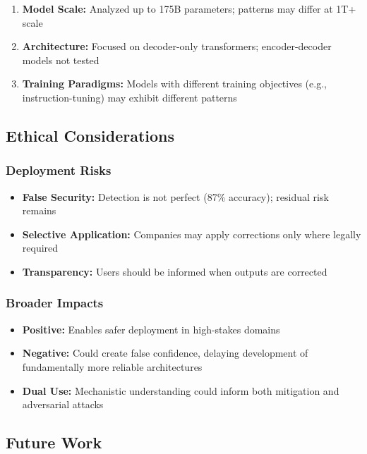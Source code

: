 \documentclass[11pt]{article}
\begin{document}
\begin{enumerate}
    \item \textbf{Model Scale:} Analyzed up to 175B parameters; patterns may differ at 1T+ scale
    \item \textbf{Architecture:} Focused on decoder-only transformers; encoder-decoder models not tested
    \item \textbf{Training Paradigms:} Models with different training objectives (e.g., instruction-tuning) may exhibit different patterns
\end{enumerate}

\subsection{Ethical Considerations}

\subsubsection{Deployment Risks}

\begin{itemize}
    \item \textbf{False Security:} Detection is not perfect (87\% accuracy); residual risk remains
    \item \textbf{Selective Application:} Companies may apply corrections only where legally required
    \item \textbf{Transparency:} Users should be informed when outputs are corrected
\end{itemize}

\subsubsection{Broader Impacts}

\begin{itemize}
    \item \textbf{Positive:} Enables safer deployment in high-stakes domains
    \item \textbf{Negative:} Could create false confidence, delaying development of fundamentally more reliable architectures
    \item \textbf{Dual Use:} Mechanistic understanding could inform both mitigation and adversarial attacks
\end{itemize}

\subsection{Future Work}
\end{document}
